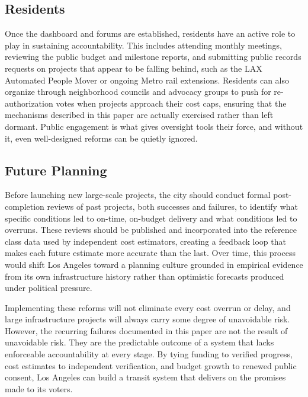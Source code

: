 \documentclass[12pt]{article}
\begin{document}
    \subsection{Residents}

    Once the dashboard and forums are established, residents have an active role to play in sustaining accountability. This includes attending monthly meetings, reviewing the public budget and milestone reports, and submitting public records requests on projects that appear to be falling behind, such as the LAX Automated People Mover or ongoing Metro rail extensions. Residents can also organize through neighborhood councils and advocacy groups to push for re-authorization votes when projects approach their cost caps, ensuring that the mechanisms described in this paper are actually exercised rather than left dormant. Public engagement is what gives oversight tools their force, and without it, even well-designed reforms can be quietly ignored.

    \subsection{Future Planning}

    Before launching new large-scale projects, the city should conduct formal post-completion reviews of past projects, both successes and failures, to identify what specific conditions led to on-time, on-budget delivery and what conditions led to overruns. These reviews should be published and incorporated into the reference class data used by independent cost estimators, creating a feedback loop that makes each future estimate more accurate than the last. Over time, this process would shift Los Angeles toward a planning culture grounded in empirical evidence from its own infrastructure history rather than optimistic forecasts produced under political pressure.

    Implementing these reforms will not eliminate every cost overrun or delay, and large infrastructure projects will always carry some degree of unavoidable risk. However, the recurring failures documented in this paper are not the result of unavoidable risk. They are the predictable outcome of a system that lacks enforceable accountability at every stage. By tying funding to verified progress, cost estimates to independent verification, and budget growth to renewed public consent, Los Angeles can build a transit system that delivers on the promises made to its voters.

    \newpage
    
    
\end{document}
